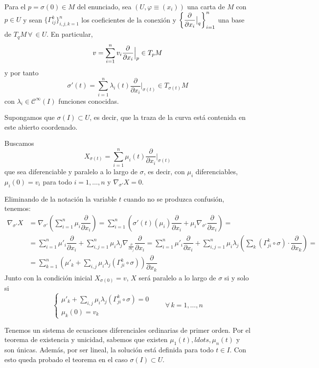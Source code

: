 \begin{dem}
    Para el $p = \sigma(0) \in M$ del enunciado, sea $(U,\varphi\equiv (x_i))$ una carta de $M$ con $p \in U$ y sean $\{\Gamma_{ij}^k\}_{i,j,k=1}^n$ los coeficientes de la conexi\'on y $\left\{ \dfrac{\partial^{} }{\partial x_i}\big|_q\right\}_{i=1}^n$ una base de $T_qM \, \forall \, \in U$. En particular,
    $$v = \sum_{i=1}^n v_i \dfrac{\partial^{} }{\partial x_i}\Big|_p \in T_pM$$
    y por tanto
    $$\sigma'(t) = \sum_{i=1}^n \lambda_i(t) \dfrac{\partial}{\partial x_i}\Big|_{\sigma(t)} \in T_{\sigma(t)}M$$    
    con $\lambda_i \in \mathcal{C}^{\infty}(I)$ funciones conocidas.
    
    Supongamos que $\sigma(I) \subset U$, es decir, que la traza de la curva está contenida en este abierto coordenado.
    
    Buscamos $$X_{\sigma(t)} = \sum_{i=1}^n \mu_i(t)  \dfrac{\partial}{\partial x_i}\Big|_{\sigma(t)}$$
    que sea diferenciable y paralelo a lo largo de $\sigma$, es decir, con $\mu_i$ diferenciables, $\mu_i(0) = v_i$ para todo $i = 1,\dots,n$ y $\nabla_{\sigma'} X = 0$.

    Eliminando de la notación la variable $t$ cuando no se produzca confusión, tenemos: \[ \begin{split} \nabla_{\sigma'} X & = \nabla_{\sigma'}\left(\sum_{i=1}^n \mu_i \dfrac{\partial}{\partial x_i}\right) = \sum_{i=1}^n\left(\sigma'(t)(\mu_i) \dfrac{\partial}{\partial x_i} + \mu_i \nabla_{\sigma'}\dfrac{\partial}{\partial x_i}\right) = \\ & = \sum_{i=1}^n \mu'_i \dfrac{\partial}{\partial x_i} + \sum_{i,j=1}^n\mu_i \lambda_j \nabla_{\frac{\partial}{\partial x_j}} \dfrac{\partial}{\partial x_i}  = \sum_{i=1}^n \mu'_i \dfrac{\partial}{\partial x_i} + \sum_{i,j=1}^n \mu_i \lambda_j \left( \sum_k (\Gamma_{ji}^k \circ \sigma) \cdot \dfrac{\partial}{\partial x_k}\right) = \\ & = \sum_{k=1}^n \left(\mu'_k + \sum_{i,j} \mu_i \lambda_j (\Gamma_{ji}^k \circ \sigma) \right) \dfrac{\partial}{\partial x_k}\end{split}\]
    Junto con la condici\'on inicial $X_{\sigma(0)} = v$, $X$ ser\'a paralelo a lo largo de $\sigma$ si y solo si
    $$\begin{cases}
        \displaystyle \mu'_k + \sum_{i,j} \mu_i \lambda_j (\Gamma_{ji}^k \circ \sigma) = 0 \\ \mu_k(0)=v_k
    \end{cases} \qquad \forall \, k =1, \ldots, n$$

    Tenemos un sistema de ecuaciones diferenciales ordinarias de primer orden. Por el teorema de existencia y unicidad, sabemos que existen $\mu_1(t),ldots, \mu_n(t)$ y son únicas. Además, por ser lineal, la solución está definida para todo $t \in I$. Con esto queda probado el teorema en el caso $\sigma(I) \subset U$.


\end{dem}

